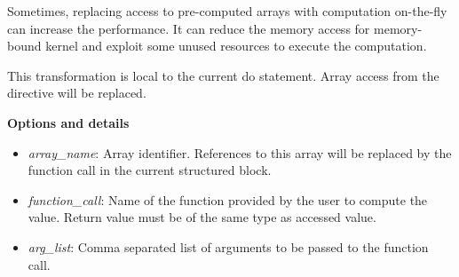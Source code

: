 Sometimes, replacing access to pre-computed arrays with computation on-the-fly
can increase the performance. It can reduce the memory access for memory-bound
kernel and exploit some unused resources to execute the computation.

This transformation is local to the current do statement. Array access from the directive will be replaced. 

\textbf{Options and details}
\begin{itemize}
\item \textit{array\_name}: Array identifier. References to this array will be replaced by the function call in the current structured block. 
\item \textit{function\_call}: Name of the function provided by the user to compute the value. Return value must be of the same type as accessed value. 
\item \textit{arg\_list}: Comma separated list of arguments to be passed to the function call. 
\end{itemize}
